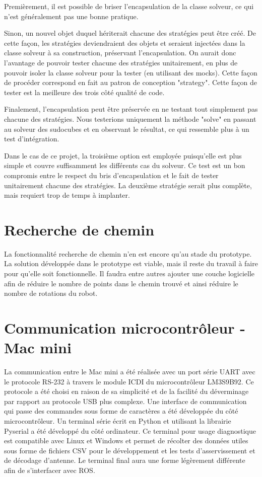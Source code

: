 Premièrement, il est possible de briser l'encapsulation de la classe solveur, ce qui n'est généralement pas une bonne pratique.

Sinon, un nouvel objet duquel hériterait chacune des stratégies peut être créé. De cette façon, les stratégies deviendraient des objets et seraient injectées dans la classe solveur à sa construction, préservant l'encapsulation. On aurait donc l'avantage de pouvoir tester chacune des stratégies unitairement, en plus de pouvoir isoler la classe solveur pour la tester (en utilisant des mocks). Cette façon de procéder correspond en fait au patron de conception "strategy". Cette façon de tester est la meilleure des trois côté qualité de code.

Finalement, l'encapsulation peut être préservée en ne testant tout simplement pas chacune des stratégies. Nous testerions uniquement la méthode "solve" en passant au solveur des sudocubes et en observant le résultat, ce qui ressemble plus à un test d'intégration.

Dans le cas de ce projet, la troisième option est employée puisqu'elle est plus simple et couvre suffisamment les différents cas du solveur. Ce test est un bon compromis entre le respect du bris d'encapsulation et le fait de tester unitairement chacune des stratégies. La deuxième stratégie serait plus complète, mais requiert trop de temps à implanter.

\section{Recherche de chemin}
La fonctionnalité recherche de chemin n’en est encore qu’au stade du prototype. La solution développée dans le prototype est viable, mais il reste du travail à faire pour qu'elle soit fonctionnelle. Il faudra entre autres ajouter une couche logicielle afin de réduire le nombre de points dans le chemin trouvé et ainsi réduire le nombre de rotations du robot.

\section{Communication microcontrôleur - Mac mini}

La communication entre le Mac mini a été réalisée avec un port série UART avec le protocole RS-232 à travers le module ICDI du microcontrôleur LM3S9B92. Ce protocole a été choisi en raison de sa simplicité et de la facilité du déverminage par rapport au protocole USB plus complexe. Une interface de communication qui passe des commandes sous forme de caractères a été développée du côté microcontrôleur. Un terminal série écrit en Python et utilisant la librairie Pyserial a été développé du côté ordinateur. Ce terminal pour usage diagnostique est compatible avec Linux et Windows et permet de récolter des données utiles sous forme de fichiers CSV pour le développement et les tests d'asservissement et de décodage d'antenne. Le terminal final aura une forme légèrement différente afin de s'interfacer avec ROS.

